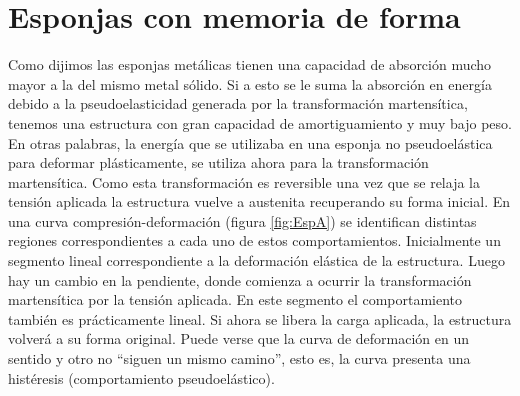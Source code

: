\documentclass[a4paper,12pt,fleqn,twoside,openany]{book}
\begin{document}






\section{Esponjas con memoria de forma }
\label{sec:SMF}

Como dijimos las esponjas metálicas tienen una capacidad de absorción mucho mayor a la del mismo metal sólido. Si a esto se le suma la absorción en energía 
debido a la pseudoelasticidad generada por la transformación martensítica, tenemos una estructura con gran capacidad de amortiguamiento y muy bajo 
peso. En otras palabras, la energía que se utilizaba en una esponja no pseudoelástica para deformar plásticamente, se utiliza ahora para la transformación
martensítica. Como esta transformación es reversible una vez que se relaja la tensión aplicada la estructura vuelve a austenita recuperando su forma 
inicial. En una curva compresión-deformación (figura \ref{fig:EspA}) se identifican distintas regiones correspondientes a cada uno de estos comportamientos. Inicialmente un 
segmento lineal correspondiente a la deformación elástica de la estructura. Luego hay un cambio en la pendiente, donde comienza a ocurrir 
la transformación martensítica por la tensión aplicada. En este segmento el comportamiento también es prácticamente lineal. Si ahora se libera la carga 
aplicada, la estructura volverá a su forma original. Puede verse que la curva de deformación en un sentido y otro no “siguen un mismo camino”, esto es, 
la curva presenta una histéresis (comportamiento pseudoelástico). 

\end{document}
